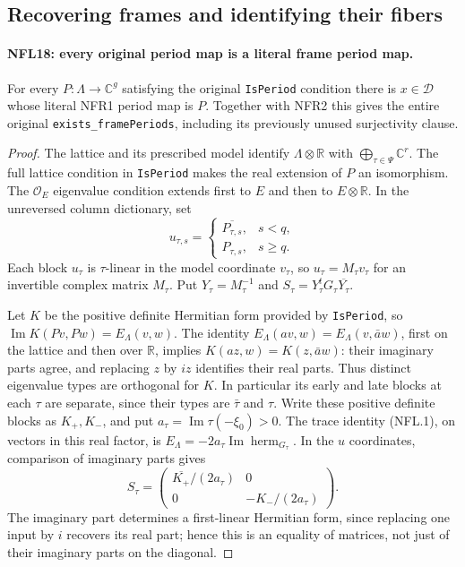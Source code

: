 \subsection{Recovering frames and identifying their fibers}

\paragraph{NFL18: every original period map is a literal frame period map.}
\label{claim:NFL18}
For every $P:\Lambda\to\mathbb C^g$ satisfying the original
\texttt{IsPeriod} condition there is $x\in\mathcal D$ whose
literal NFR1 period map is $P$.  Together with NFR2 this gives
the entire original \texttt{exists\_framePeriods}, including
its previously unused surjectivity clause.

\begin{proof}
The lattice and its prescribed model identify
$\Lambda\otimes\mathbb R$ with
$\bigoplus_{\tau\in\Psi}\mathbb C^r$.
The full lattice condition in \texttt{IsPeriod} makes the real
extension of $P$ an isomorphism.  The $\mathcal O_E$ eigenvalue
condition extends first to $E$ and then to $E\otimes\mathbb R$.
In the unreversed column dictionary, set
\[
 u_{\tau,s}=\begin{cases}
   \overline{P_{\tau,s}},&s<q,\\ P_{\tau,s},&s\ge q.
   \end{cases}
\]
Each block $u_\tau$ is $\tau$-linear in the model coordinate
$v_\tau$, so $u_\tau=M_\tau v_\tau$ for an invertible complex
matrix $M_\tau$.  Put $Y_\tau=M_\tau^{-1}$ and
$S_\tau=Y_\tau^tG_\tau\overline{Y_\tau}$.

Let $K$ be the positive definite Hermitian form provided by
\texttt{IsPeriod}, so $\operatorname{Im}K(Pv,Pw)=E_\Lambda(v,w)$.
The identity $E_\Lambda(av,w)=E_\Lambda(v,\bar a w)$, first
on the lattice and then over $\mathbb R$, implies
$K(az,w)=K(z,\bar a w)$: their imaginary parts agree, and
replacing $z$ by $iz$ identifies their real parts.
Thus distinct eigenvalue types are orthogonal for $K$.
In particular its early and late blocks at each $\tau$ are
separate, since their types are $\bar\tau$ and $\tau$.
Write these positive definite blocks as $K_+,K_-$, and put
$a_\tau=\operatorname{Im}\tau(-\xi_0)>0$.
The trace identity (NFL.1), on vectors in this real factor, is
$E_\Lambda=-2a_\tau\operatorname{Im}\operatorname{herm}_{G_\tau}$.
In the $u$ coordinates, comparison of imaginary parts gives
\[
 S_\tau=
 \begin{pmatrix}
  \overline{K_+}/(2a_\tau)&0\\
  0&-K_-/(2a_\tau)
 \end{pmatrix}.
 \tag{NFL.25}
\]
The imaginary part determines a first-linear Hermitian form,
since replacing one input by $i$ recovers its real part; hence
this is an equality of matrices, not just of their imaginary
parts on the diagonal.


\end{proof}
